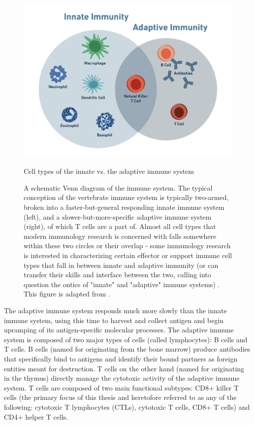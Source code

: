 \begin{figure}[htbp]
	\centering
	\includegraphics[width=\textwidth]{../figures/chapter1/innateadaptiveimmunesystem.png}
	\caption{Cell types of the innate vs. the adaptive immune system}
	\caption*{A schematic Venn diagram of the immune system. The typical conception of the vertebrate immune system is typically two-armed, broken into a faster-but-general responding innate immune system (left), and a slower-but-more-specific adaptive immune system (right), of which T cells are a part of.  Almost all cell types that modern immunology research is concerned with falls somewhere within these two circles or their overlap - some immunology research is interested in characterizing certain effector or support immune cell types that fall in between innate and adaptive immunity (or can transfer their skills and interface between the two, calling into question the ontics of "innate" and "adaptive" immune systems) \cite{Heidegger1962}. This figure is adapted from \cite{Alam2007}.}
	\label{fig:innateadaptiveimmunesystem}
\end{figure}

The adaptive immune system responds much more slowly than the innate immune system, using this time to harvest and collect antigen and begin upramping of its antigen-specific molecular processes. The adaptive immune system is composed of two major types of cells (called lymphocytes): B cells and T cells. B cells (named for originating from the bone marrow) produce antibodies that specifically bind to antigens and identify their bound partners as foreign entities meant for destruction. T cells on the other hand (named for originating in the thymus) directly manage the cytotoxic activity of the adaptive immune system. T cells are composed of two main functional subtypes: CD8+ killer T cells (the primary focus of this thesis and heretofore referred to as any of the following: cytotoxic T lymphocytes (CTLs), cytotoxic T cells, CD8+ T cells) and CD4+ helper T cells. 

